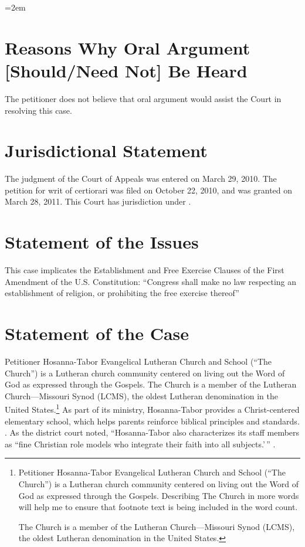 \documentclass[12pt,\documentclassflag]{FRAP_Brief}
\author{Brendan Bernicker}
\def\HTDist#1{\pincite{Hosanna-Tabor I}{#1}}
\begin{document}
\makefrontmatter

\parindent=2em
\setlength{\parskip}{1.25ex plus 2ex minus .5ex}

\section{Reasons Why Oral Argument [Should/Need Not] Be Heard} %
The petitioner does not believe that oral argument would assist the Court in resolving this case.


\section{Jurisdictional Statement}
The judgment of the Court of Appeals was entered on March 29, 2010. The petition for writ of certiorari was filed on October 22, 2010, and was granted on March 28, 2011. This Court has jurisdiction under
.

\section{Statement of the Issues}
This case implicates the Establishment and Free Exercise Clauses of the First Amendment of the U.S. Constitution\cite[!]{1stamend}: ``Congress shall make no law respecting an establishment of religion, or prohibiting the free exercise thereof\ldotss''


\section{Statement of the Case}

Petitioner Hosanna-Tabor Evangelical Lutheran Church and School (``The Church'') is a Lutheran church community centered on living out the Word of God as expressed through the Gospels. The Church is a member of the Lutheran Church---Missouri Synod (LCMS), the oldest Lutheran denomination in the United States.\footnote{Petitioner Hosanna-Tabor Evangelical Lutheran Church and School (``The Church'') is a Lutheran church community centered on living out the Word of God as expressed through the Gospels. Describing The Church in more words will help me to ensure that footnote text is being included in the word count.\par The Church is a member of the Lutheran Church---Missouri Synod (LCMS), the oldest Lutheran denomination in the United States.} As part of its ministry, Hosanna-Tabor provides a Christ-centered elementary school, which helps parents reinforce biblical principles and standards. \See \HTDist{884}.  As the district court noted, ``Hosanna-Tabor also characterizes its staff members as ``fine Christian role models who integrate their faith into all subjects.'\,'' \HTDist{884}.
\end{document}
